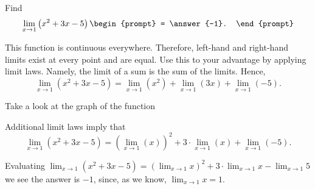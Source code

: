 \documentclass{ximera}
\author{Gregory Hartman \and Matthew Carr}
\begin{document}
\begin{exercise}


  
  
  Find 
  \[
  \lim_{x\to 1} \left(x^2+3x-5\right)
  \begin{prompt}
  = \answer{-1}.
  \end{prompt}
  \]
  
   \begin{hint}
      This function is continuous everywhere. Therefore, left-hand and right-hand limits exist at every point and are equal. Use this to your advantage by applying limit laws. Namely, the limit of a sum is the sum of the limits. Hence, 
    \[
    \lim_{x\to 1} \left( x^2+3x-5 \right)  
    = \lim_{x\to 1} \left( x^2 \right) +
    \lim_{x\to 1} \left( 3x \right) +
    \lim_{x\to 1} \left( -5 \right).
    \]
    \end{hint}
    
     \begin{hint}
    Take a look at the graph of the function
    \begin{center}
      \end{center}
    Additional limit laws imply that
    \[
    \lim_{x\to 1} \left( x^2+3x-5 \right)  
    = \left( \lim_{x\to 1} \left( x \right) \right)^2 +
    3 \cdot \lim_{x\to 1} \left( x \right) +
    \lim_{x\to 1} \left( -5 \right).
    \]
    \end{hint}
    \begin{hint}
     Evaluating $\lim_{x\to 1} \left(x^2+3x-5\right)  
    = \left(\lim_{x\to 1}  x \right)^2 +
    3\cdot\lim_{x\to 1} x  -
    \lim_{x\to 1} 5$
    we see the answer is $-1$, since, as we know, $\lim_{x\to1}x=1$.
    \end{hint}
    
\end{exercise}
\end{document}
